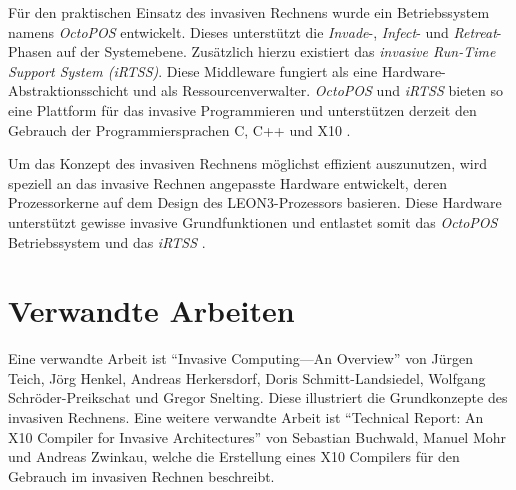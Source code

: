 Für den praktischen Einsatz des invasiven Rechnens wurde ein Betriebssystem namens \textit{OctoPOS} entwickelt.
Dieses unterstützt die \textit{Invade}-, \textit{Infect}- und \textit{Retreat}-Phasen auf der Systemebene.
Zusätzlich hierzu existiert das \textit{invasive Run-Time Support System (iRTSS)}. Diese Middleware
fungiert als eine Hardware-Abstraktionsschicht und als Ressourcenverwalter.
\textit{OctoPOS} und \textit{iRTSS} bieten so eine Plattform für das invasive Programmieren und
unterstützen derzeit den Gebrauch der Programmiersprachen C, C++ und X10
\cite{octopos}\cite{invasiveManyCore}\cite{invasiveRISC}.

Um das Konzept des invasiven Rechnens möglichst effizient auszunutzen, wird speziell an das invasive Rechnen
angepasste Hardware entwickelt, deren Prozessorkerne auf dem Design des LEON3-Prozessors basieren.
Diese Hardware unterstützt gewisse invasive Grundfunktionen und entlastet somit das \textit{OctoPOS} Betriebssystem
und das \textit{iRTSS} \cite{invasiveArrays}.

\section{Verwandte Arbeiten}

Eine verwandte Arbeit ist "`Invasive Computing—An Overview"' \cite{invasiveOverview}
von Jürgen Teich, Jörg Henkel, Andreas Herkersdorf, Doris Schmitt-Landsiedel, Wolfgang Schröder-Preikschat
und Gregor Snelting. Diese illustriert die Grundkonzepte des invasiven Rechnens.
Eine weitere verwandte Arbeit ist "`Technical Report: An X10 Compiler for Invasive Architectures"' \cite{invasiveX10}
von Sebastian Buchwald, Manuel Mohr und Andreas Zwinkau, welche die Erstellung eines X10 Compilers für den Gebrauch 
im invasiven Rechnen beschreibt.
